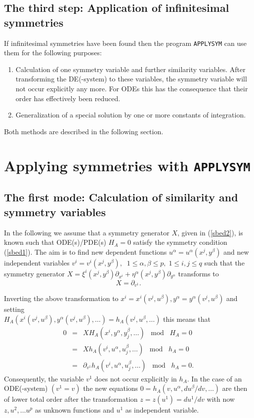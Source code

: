 \documentclass[12pt]{article}
\begin{document}
\subsection{The third step: Application of infinitesimal symmetries}
If infinitesimal symmetries have been found then
the program {\tt APPLYSYM} can use them for the following purposes:
\begin{enumerate}
\item Calculation of one symmetry variable and further similarity variables.
After transforming
the DE(-system) to these variables, the symmetry variable will not occur
explicitly any more. For ODEs this has the consequence that their order has
effectively been reduced.
\item Generalization of a special solution by one or more constants of
integration.
\end{enumerate}
Both methods are described in the following section.
\section{Applying symmetries with {\tt APPLYSYM}}
\subsection{The first mode: Calculation of similarity and symmetry variables}
In the following we assume that a symmetry generator $X$, given
in (\ref{sbed2}), is known such that ODE(s)/PDE(s) $H_A=0$
satisfy the symmetry condition (\ref{sbed1}). The aim is to
find new dependent functions $u^\alpha = u^\alpha(x^j,y^\beta)$ and
new independent variables $v^i = v^i(x^j,y^\beta),\;\;
1\leq\alpha,\beta\leq p,\;1\leq i,j \leq q$
such that the symmetry generator
$X = \xi^i(x^j,y^\beta)\partial_{x^i} +
     \eta^\alpha(x^j,y^\beta)\partial_{y^\alpha}$
transforms to
\begin{equation}
X = \partial_{v^1}.    \label{sbed3}
\end{equation}

Inverting the above transformation to $x^i=x^i(v^j,u^\beta),
y^\alpha=y^\alpha(v^j,u^\beta)$ and setting \\
$H_A(x^i(v^j,u^\beta), y^\alpha(v^j,u^\beta),\ldots) =
h_A(v^j, u^\beta,\ldots)$
this means that
\begin{eqnarray*}
 0 & = & X H_A(x^i,y^\alpha,y^\beta_j,\ldots)\;\;\; \mbox{mod} \;\;\; H_A=0 \\
   & = & X h_A(v^i,u^\alpha,u^\beta_j,\ldots)\;\;\; \mbox{mod} \;\;\; h_A=0 \\
   & = & \partial_{v^1}h_A(v^i,u^\alpha,u^\beta_j,\ldots)\;\;\; \mbox{mod}
         \;\;\; h_A=0.
\end{eqnarray*}
Consequently, the variable $v^1$ does not occur explicitly in $h_A$.
In the case of an ODE(-system) $(v^1=v)$
the new equations $0=h_A(v,u^\alpha,du^\beta/dv,\ldots)$
are then of lower total order
after the transformation $z = z(u^1) = du^1/dv$ with now $z, u^2,\ldots u^p$
as unknown functions and $u^1$ as independent variable.
\end{document}
